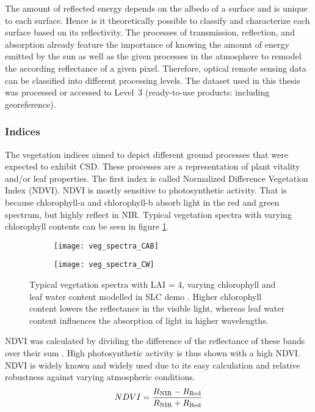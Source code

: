 The amount of reflected energy depends on the albedo of a surface and is unique to each surface. Hence is it theoretically possible to classify and characterize each surface based on its reflectivity.
The processes of transmission, reflection, and absorption already feature the importance of knowing the amount of energy emitted by the sun as well as the given processes in the atmosphere to remodel the according reflectance of a given pixel. Therefore, optical remote sensing data can be classified into different processing levels. The dataset used in this thesis was processed or accessed to Level~3 (ready-to-use products: including georeference).\\


\subsubsection{Indices}
The vegetation indices aimed to depict different ground processes that were expected to exhibit CSD. These processes are a representation of plant vitality and/or leaf properties. The first index is called Normalized Difference Vegetation Index (NDVI). NDVI is mostly sensitive to photosynthetic activity. That is because chlorophyll-a and chlorophyll-b absorb light in the red and green spectrum, but highly reflect in NIR. Typical vegetation spectra with varying chlorophyll contents can be seen in figure \ref{fig:vegspec}.

\begin{figure}[htp]
	\centering
	\begin{subfigure}{0.49\textwidth}	
		\centering
		\texttt{[image: veg\_spectra\_CAB]}
	\end{subfigure}
	\begin{subfigure}{0.49\textwidth}	
		\centering
		\texttt{[image: veg\_spectra\_CW]}
	\end{subfigure}
	\caption{Typical vegetation spectra with LAI = 4, varying chlorophyll and leaf water content modelled in SLC demo \citep{verhoef2007}. Higher chlorophyll content lowers the reflectance in the visible light, whereas leaf water content influences the absorption of light in higher wavelengths.}\label{fig:vegspec}
\end{figure}	

NDVI was calculated by dividing the difference of the reflectance of these bands over their sum \citep[\textit{cf.} formula \ref{eq:ndvi}, after][]{tucker1979}. High photosynthetic activity is thus shown with a high NDVI. NDVI is widely known and widely used due to its easy calculation and relative robustness against varying atmospheric conditions.\\
\begin{equation}\label{eq:ndvi}
	NDVI = \frac{R\textsubscript{NIR} - R\textsubscript{Red}}{R\textsubscript{NIR} + R\textsubscript{Red}} 
\end{equation}\\

